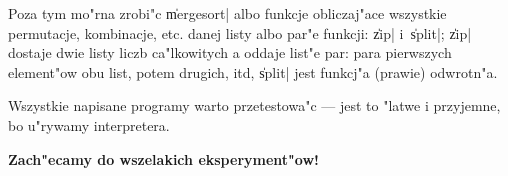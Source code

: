 Poza tym mo"rna zrobi"c \|mergesort| albo funkcje obliczaj"ace
wszystkie permutacje, kombinacje, etc. danej listy 
albo par"e funkcji: \|zip| i~\|split|; \|zip| dostaje dwie listy
liczb ca"lkowitych a oddaje list"e par: para pierwszych element"ow
obu list, potem drugich, itd, \|split| jest funkcj"a (prawie) odwrotn"a.

Wszystkie napisane programy warto przetestowa"c ---
jest to "latwe i przyjemne, bo u"rywamy interpretera. 

{\bf Zach"ecamy do wszelakich eksperyment"ow!}

